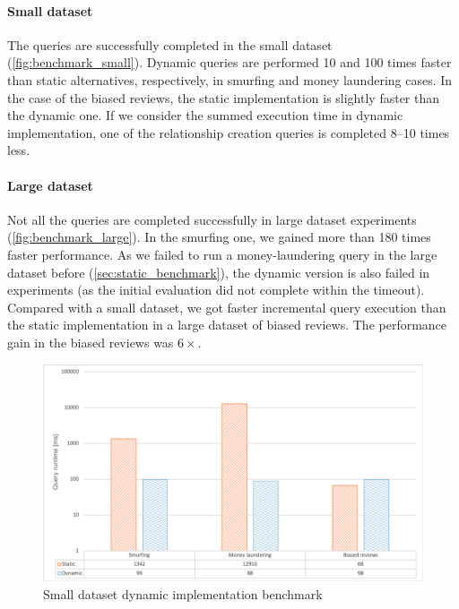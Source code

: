 \paragraph{Small dataset} The queries are successfully completed in the small dataset (\autoref{fig:benchmark_small}).
Dynamic queries are performed 10 and 100 times faster than static alternatives, respectively, in smurfing and money laundering cases.
In the case of the biased reviews, the static implementation is slightly faster than the dynamic one.
If we consider the summed execution time in dynamic implementation, one of the relationship creation queries is completed 8--10 times less. 

\paragraph{Large dataset} Not all the queries are completed successfully in large dataset experiments (\autoref{fig:benchmark_large}).
In the smurfing one, we gained more than 180 times faster performance. 
As we failed to run a money-laundering query in the large dataset before (\autoref{sec:static_benchmark}), the dynamic version is also failed in experiments (as the initial evaluation did not complete within the timeout).
Compared with a small dataset, we got faster incremental query execution than the static implementation in a large dataset of biased reviews.
The performance gain in the biased reviews was $6\times$.

\begin{figure}[!ht]
  \centering
  \includegraphics[width=\textwidth]{figures/dynamic_benchmark_plot_small.png}
  \caption{Small dataset dynamic implementation benchmark} 
  \label{fig:benchmark_small}
\end{figure}


